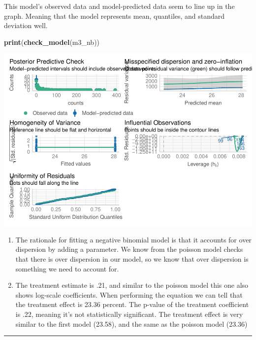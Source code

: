 \documentclass[
]{article}
\newenvironment{Shaded}{\begin{snugshade}}{\end{snugshade}}
\newcommand{\FunctionTok}[1]{\textcolor[rgb]{0.13,0.29,0.53}{\textbf{#1}}}
\newcommand{\NormalTok}[1]{#1}
\begin{document}
This model's observed data and model-predicted data seem to line up in
the graph. Meaning that the model represents mean, quantiles, and
standard deviation well.

\begin{Shaded}
\begin{Highlighting}[]
\FunctionTok{print}\NormalTok{(}\FunctionTok{check\_model}\NormalTok{(m3\_nb))}
\end{Highlighting}
\end{Shaded}

\includegraphics{hw1-lobstrs-eds241_files/figure-latex/unnamed-chunk-20-1.pdf}

\begin{enumerate}
\def\labelenumi{\alph{enumi}.}
\setcounter{enumi}{7}
\item
  The rationale for fitting a negative binomial model is that it
  accounts for over dispersion by adding a parameter. We know from the
  poisson model checks that there is over dispersion in our model, so we
  know that over dispersion is something we need to account for.
\item
  The treatment estimate is .21, and similar to the poisson model this
  one also shows log-scale coefficients. When performing the equation we
  can tell that the treatment effect is 23.36 percent. The p-value of
  the treatment coefficient is .22, meaning it's not statistically
  significant. The treatment effect is very similar to the first model
  (23.58), and the same as the poisson model (23.36)
\end{enumerate}

\begin{center}\rule{0.5\linewidth}{0.5pt}\end{center}
\end{document}
